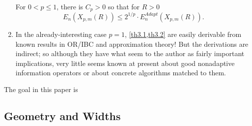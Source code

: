 \begin{enumerate}
\begin{theorem}
            For $0<p\leq 1$, there is $C_p > 0$ so that for $R > 0$
            \begin{equation*}
                E_n(X_{p,m}(R)) \leq 2^{1/p} \cdot E_n^{Adapt}(X_{p,m}(R)).
            \end{equation*}
            \label{th3.2}
        \end{theorem}
    \item In the already-interesting case $p=1$, \cref{th3.1,th3.2} are easily derivable from known results in OR/IBC and approximation theory! But the derivations are indirect; so although they have what seem to the author as fairly important implications, very little seems known at present about good nonadaptive information operators or about concrete algorithms matched to them. 
\end{enumerate}

The goal in this paper is 

\subsection{Geometry and Widths}
\label{n-widths}

